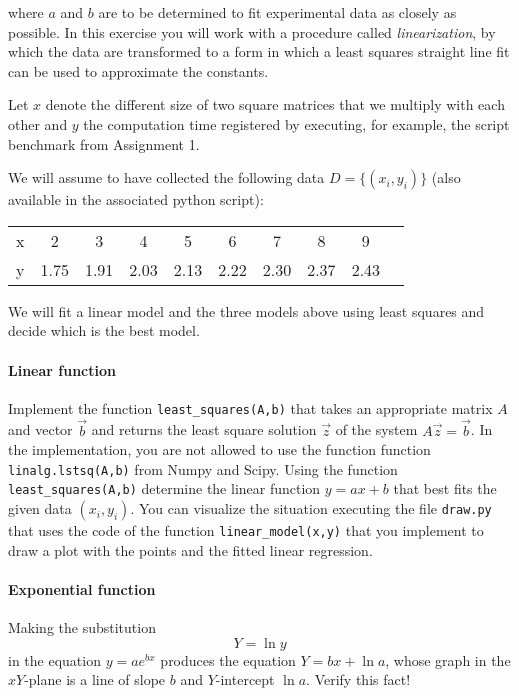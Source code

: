 \documentclass[a4paper,10pt]{article}
\begin{document}
where $a$ and $b$ are to be determined to fit experimental data as
closely as possible. In this exercise you will work with a procedure
called \emph{linearization}, by which the data are transformed to a form
in which a least squares straight line fit can be used to approximate
the constants. %


Let $x$ denote the different size of two square matrices that we
multiply with each other and $y$ the computation time registered by
executing, for example, the script benchmark from Assignment 1.

We will assume to have collected the following data $D=\{(x_i,y_i)\}$
(also available in the associated python script):

\begin{table}[h]
  \centering
  \begin{tabular}{l|*{9}{c}}
    x&2&3&4&5&6&7&8&9\\
    y&1.75&1.91&2.03&2.13&2.22&2.30&2.37&2.43
  \end{tabular}
\end{table}
    
We will fit a linear model and the three models above using least
squares and decide which is the best model.



\paragraph{Linear function} Implement the function
\lstinline{least_squares(A,b)} that takes an appropriate matrix $A$ and
vector $\vec b$ and returns the least square solution $\vec z$ of the
system $A\vec z=\vec b$. In the implementation, you are not allowed to
use the function function \lstinline{linalg.lstsq(A,b)} from Numpy and
Scipy.  Using the function \lstinline{least_squares(A,b)} determine the
linear function $y=ax + b$ that best fits the given data $(x_i,y_i)$.
You can visualize the situation executing the file \lstinline{draw.py}
that uses the code of the function \lstinline{linear_model(x,y)} that
you implement to draw a plot with the points and the fitted linear
regression.

\paragraph{Exponential function}
Making the substitution \[Y=\ln y\] in the equation $y=ae^{bx}$ produces the
equation $Y=bx+\ln a$, whose graph in the $xY$-plane is a line of slope
$b$ and $Y$-intercept $\ln a$.  Verify this fact!
\end{document}

